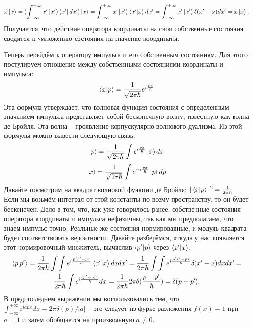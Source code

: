 \[
\hat{x}\ket{x} = (\int_{-\infty}^{+\infty}x'\ket{x'}\bra{x'}dx')\ket{x} = \int_{-\infty}^{+\infty}x'\ket{x'}\bra{x'}\ket{x}dx' = \int_{-\infty}^{+\infty}x'\ket{x'}\delta(x'-x)dx' = x\ket{x}.
\]
Получается, что действие оператора координаты на свои собственные состояния сводится к умножению состояния на значение координаты. 

Теперь перейдём к оператору импульса и его собственным состояниям. Для этого постулируем отношение между собственными состояниями координаты и импульса:
\[
\bra{x}\ket{p} = \frac{1}{\sqrt{2\pi\hbar}}e^{i\frac{px}{\hbar}}
\]
Эта формула утверждает, что волновая функция состояния с определенным значением импульса представляет собой бесконечную волну, известную как волна де Бройля. Эта волна -- проявление корпускулярно-волнового дуализма. Из этой формулы можно вывести следующую связь:
\[
\ket{p} = \frac{1}{\sqrt{2\pi\hbar}}\int e^{i\frac{px}{\hbar}}\ket{x}dx
\]
\[
\ket{x} = \frac{1}{\sqrt{2\pi\hbar}}\int e^{-i\frac{px}{\hbar}}\ket{p}dp
\]
Давайте посмотрим на квадрат волновой функции де Бройля: $|\bra{x}\ket{p}|^2 = \frac{1}{2\pi\hbar}$. Если мы возьмём интеграл от этой константы по всему пространству, то он будет бесконечен. Дело в том, что, как уже говорилось ранее, собственные состояния оператора координаты и импульса нефизичны, так как мы предполагаем, что знаем импульс точно. Реальные же состояния нормированные, и модуль квадрата будет соответствовать вероятности. Давайте разберёмся, откуда у нас появляется этот нормировочный множитель, вычислив $\bra{p'}\ket{p}$ через $\bra{x'}\ket{x}$.
\begin{multline*}
\bra{p}\ket{p'} = \frac{1}{2\pi\hbar}\int\int e^{i\frac{p'x'-px}{\hbar}}\bra{x'}\ket{x}dxdx' = \frac{1}{2\pi\hbar}\int\int e^{i\frac{p'x'-px}{\hbar}}\delta(x'-x)dxdx' =\\ \frac{1}{2\pi\hbar}\int e^{i\frac{(p'-p)x}{\hbar}}dx = \frac{1}{2\pi\hbar}2\pi\delta(\frac{p-p'}{\hbar}) = \delta(p-p').
\end{multline*}
В предпоследнем выражении мы воспользовались тем, что $\int_{-\infty}^{+\infty} e^{iapx}dx = 2\pi\delta(p)/|a|$ -- это следует из фурье разложения $f(x) = 1$ при $a=1$ и затем обобщается на произвольную $a\neq 0$.

